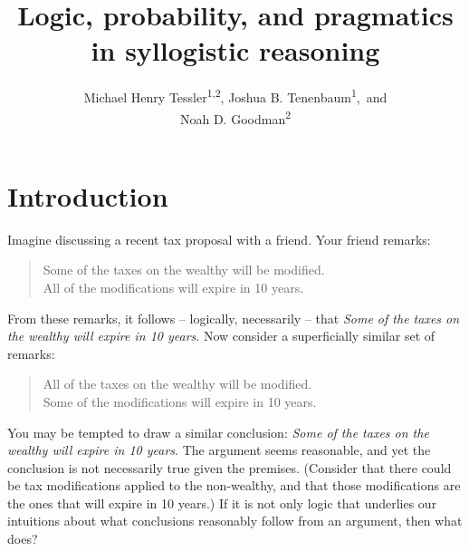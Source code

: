 \documentclass[floatsintext, doc]{apa6}
\title{Logic, probability, and pragmatics in syllogistic reasoning}
\author{Michael Henry Tessler\textsuperscript{1}\textsuperscript{,2}, Joshua B. Tenenbaum\textsuperscript{1},~and \\Noah D. Goodman\textsuperscript{2}}
\date{}
\affiliation{
\vspace{0.5cm}
\textsuperscript{1} Department of Brain and Cognitive Sciences, Massachusetts Institute of Technology \\
\textsuperscript{2} Department of Psychology, Stanford University
}
\date{}
\newenvironment{aquote}[1]
{\savebox\mybox{#1}\begin{quote}} {\signed{\usebox\mybox}\end{quote}}
\begin{document}
\maketitle




\section{Introduction}

Imagine discussing a recent tax proposal with a friend. Your friend remarks:

\begin{quote}
Some of the taxes on the wealthy will be modified. \\
All of the modifications will expire in 10 years.
\end{quote}

From these remarks, it follows -- logically, necessarily -- that \emph{Some of the taxes on the wealthy will expire in 10 years}.
Now consider a superficially similar set of remarks: 

\begin{quote}
All of the taxes on the wealthy will be modified. \\
Some of the modifications will expire in 10 years.
\end{quote}

You may be tempted to draw a similar conclusion:  \emph{Some of the taxes on the wealthy will expire in 10 years}.
The argument seems reasonable, and yet the conclusion is not necessarily true given the premises. (Consider that there could be tax modifications applied to the non-wealthy, and that those modifications are the ones that will expire in 10 years.)
If it is not only logic that underlies our intuitions about what conclusions reasonably follow from an argument, then what does?
\end{document}
